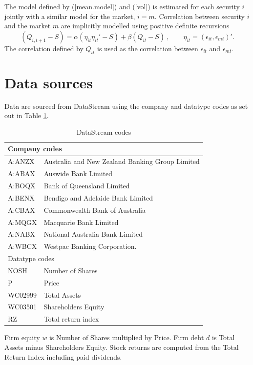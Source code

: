 \documentclass[authoryear]{elsarticle}
\newcommand{\eps}{\epsilon}
\newcommand{\eref}[1]{(\ref{#1})}
\newcommand{\tref}[1]{Table \ref{#1}}
\newcommand{\cq}{\ , \qquad}
\begin{document}
The model defined by \eref{mean.model} and \eref{vol} is estimated  for each security $i$ jointly with  a similar model for  the market,  $i=m$.   Correlation between security $i$ and the market $m$ are implicitly modelled using  positive definite recursions   \citep{engle2002dynamic}
$$
(Q_{i,t+1}-S) = \alpha (\eta_{it}\eta_{it}'-S) + \beta (Q_{it}-S)\cq \eta_{it}=(\eps_{it},\eps_{mt})' .
$$
The correlation defined by $Q_{it}$ is used as the correlation between $\eps_{it}$ and $\eps_{mt}$.


\section{Data sources}\label{data}

Data are sourced from DataStream using the company and datatype codes as set out in \tref{datastream}.

\begin{table}\caption{DataStream codes}\label{datastream}
\begin{center}
	\begin{tabular}{l|l}
	\hline
	\multicolumn{2}{l}{Company codes}\\
	\hline
A:ANZX & Australia and New Zealand Banking Group Limited\\
A:ABAX & Auswide Bank Limited\\
A:BOQX & Bank of Queensland Limited\\
A:BENX & Bendigo and Adelaide Bank Limited\\
A:CBAX & Commonwealth Bank of Australia\\
A:MQGX & Macquarie Bank Limited\\
A:NABX & National Australia Bank Limited\\
A:WBCX & Westpac Banking Corporation.\\
\hline
\multicolumn{2}{l}{Datatype codes}\\
\hline
	NOSH & Number of Shares\\
	P & Price\\
	WC02999 & Total Assets\\
	WC03501 & Shareholders Equity\\
	RZ & Total return index\\
\hline	
\end{tabular}
\end{center}
\end{table}

Firm equity $w$ is Number of Shares multiplied by Price. Firm debt $d$ is Total Assets minus Shareholders Equity. Stock returns are computed from the Total Return Index including paid dividends. 
\end{document}
